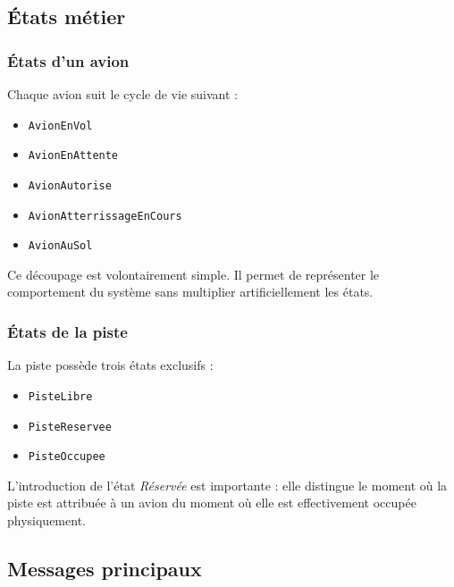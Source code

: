 \documentclass[11pt,a4paper]{article}
\begin{document}
\subsection{États métier}

\subsubsection{États d'un avion}

Chaque avion suit le cycle de vie suivant :
\begin{itemize}
    \item \texttt{AvionEnVol}
    \item \texttt{AvionEnAttente}
    \item \texttt{AvionAutorise}
    \item \texttt{AvionAtterrissageEnCours}
    \item \texttt{AvionAuSol}
\end{itemize}

Ce découpage est volontairement simple. Il permet de représenter le comportement du système sans multiplier artificiellement les états.

\subsubsection{États de la piste}

La piste possède trois états exclusifs :
\begin{itemize}
    \item \texttt{PisteLibre}
    \item \texttt{PisteReservee}
    \item \texttt{PisteOccupee}
\end{itemize}

L'introduction de l'état \emph{Réservée} est importante : elle distingue le moment où la piste est attribuée à un avion du moment où elle est effectivement occupée physiquement.

\subsection{Messages principaux}
\end{document}
